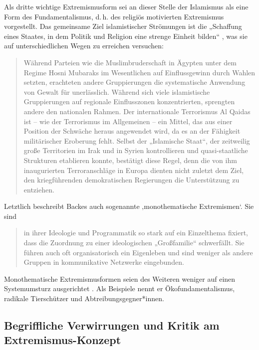 Als dritte wichtige Extremismusform sei an dieser Stelle der Islamismus als eine Form des Fundamentalismus, d.\,h. des religiös motivierten Extremismus vorgestellt. Das gemeinsame Ziel islamistischer Strömungen ist die „Schaffung eines Staates, in dem Politik und Religion eine strenge Einheit bilden`` \autocite[146]{backesExtremistischeIdeologien2018}, was sie auf unterschiedlichen Wegen zu erreichen versuchen:
\largerpage[-2]
\begin{quote}
Während Parteien wie die Muslimbruderschaft in Ägypten unter dem Regime Hosni Mubaraks im Wesentlichen auf Einflussgewinn durch Wahlen setzten, erachteten andere Gruppierungen die systematische Anwendung von Gewalt für unerlässlich. Während sich viele islamistische Gruppierungen auf regionale Einflusszonen konzentrierten, sprengten andere den nationalen Rahmen. Der internationale Terrorismus Al Qaidas ist -- wie der Terrorismus im Allgemeinen -- ein Mittel, das aus einer Position der Schwäche heraus angewendet wird, da es an der Fähigkeit militärischer Eroberung fehlt. Selbst der „Islamische Staat``, der zeitweilig große Territorien im Irak und in Syrien kontrollieren und quasi-staatliche Strukturen etablieren konnte, bestätigt diese Regel, denn die von ihm inaugurierten Terroranschläge in Europa dienten nicht zuletzt dem Ziel, den kriegführenden demokratischen Regierungen die Unterstützung zu entziehen. \autocite[146]{backesExtremistischeIdeologien2018}
\end{quote}

Letztlich beschreibt Backes auch sogenannte ‚monothematische Extremismen`. Sie sind

\begin{quote}
in ihrer Ideologie und Programmatik so stark auf ein Einzelthema fixiert, dass die Zuordnung zu einer ideologischen „Großfamilie`` schwerfällt. Sie führen auch oft organisatorisch ein Eigenleben und sind weniger als andere Gruppen in kommunikative Netzwerke eingebunden. \autocite[150]{backesExtremistischeIdeologien2018}
\end{quote}

Monothematische Extremismusformen seien des Weiteren weniger auf einen Systemumsturz ausgerichtet \autocite[151]{backesExtremistischeIdeologien2018}. Als Beispiele nennt er Ökofundamentalismus, radikale Tierschützer und Abtreibungsgegner*innen.

\subsection{Begriffliche Verwirrungen und Kritik am Extremismus-Konzept}\label{begriffliche-verwirrungen-und-kritik-am-extremismus-konzept}

